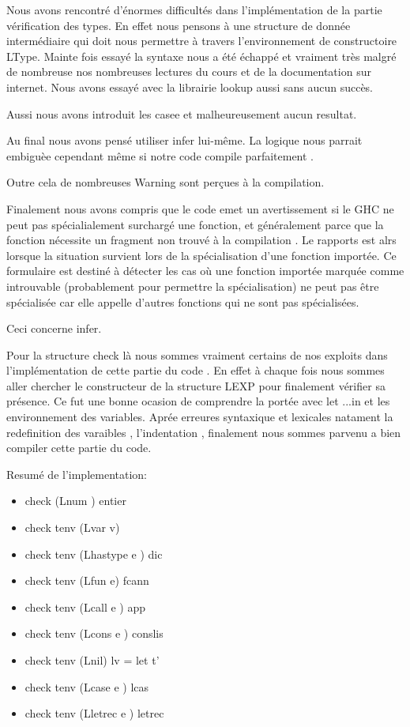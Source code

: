\documentclass{article}
\begin{document}
Nous avons rencontré d’énormes difficultés dans l’implémentation de la partie vérification des types. En effet nous pensons à une structure de donnée intermédiaire qui doit nous permettre à travers l’environnement de constructoire LType. Mainte fois essayé la syntaxe nous a été échappé et vraiment très malgré de nombreuse nos nombreuses lectures du cours et de la documentation sur internet. Nous avons essayé avec la librairie lookup aussi sans aucun succès.

Aussi nous avons introduit les casee et malheureusement aucun resultat.

Au final nous avons pensé utiliser infer lui-même. La logique nous parrait embiguèe  cependant même si notre code compile parfaitement .

Outre cela de nombreuses Warning sont perçues à la compilation.

Finalement nous avons compris que le code emet un avertissement si le GHC ne peut pas spécialialement surchargé une fonction,  et généralement parce que la fonction nécessite un fragment non trouvé à la compilation . Le rapports  est alrs lorsque la situation survient lors de la spécialisation d'une fonction importée. Ce formulaire est destiné à détecter les cas où une fonction importée marquée comme introuvable (probablement pour permettre la spécialisation) ne peut pas être spécialisée car elle appelle d'autres fonctions qui ne sont pas spécialisées.

 Ceci concerne infer.

Pour la structure check là nous sommes vraiment certains de nos exploits dans l’implémentation de cette partie du code . En effet à chaque fois nous sommes aller chercher le  constructeur de la structure LEXP pour finalement vérifier sa présence. 
Ce fut une bonne ocasion de comprendre la portée avec let ...in et les environnement des variables. Aprée erreures syntaxique  et lexicales natament la redefinition des varaibles , l'indentation , finalement nous sommes parvenu a bien compiler cette partie du code.

Resumé de l'implementation:
\begin{itemize}  
\item check (Lnum ) entier 
\item check tenv (Lvar v)  
\item check tenv (Lhastype e ) dic 
\item check tenv (Lfun  e) fcann 
\item check tenv (Lcall e ) app 
\item check tenv (Lcons e ) conslis 
\item check tenv (Lnil) lv = let t' 
\item check tenv (Lcase e ) lcas 
\item check tenv (Lletrec e )  letrec 
\end{itemize}
\end{document}
